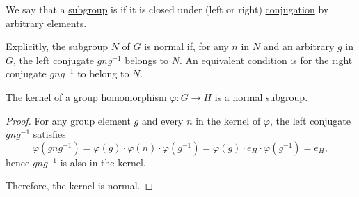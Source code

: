 \begin{definition}\label{def:normal_subgroup}
  We say that a \hyperref[def:group/submodel]{subgroup} is  if it is closed under (left or right) \hyperref[def:group_conjugation]{conjugation} by arbitrary elements.

  Explicitly, the subgroup \( N \) of \( G \) is normal if, for any \( n \) in \( N \) and an arbitrary \( g \) in \( G \), the left conjugate \( gng^{-1} \) belongs to \( N \). An equivalent condition is for the right conjugate \( gng^{-1} \) to belong to \( N \).
\end{definition}

\begin{proposition}\label{thm:kernel_is_normal_subgroup}
  The \hyperref[def:group/kernel]{kernel} of a \hyperref[def:group/homomorphism]{group homomorphism} \( \varphi: G \to H \) is a \hyperref[def:normal_subgroup]{normal subgroup}.
\end{proposition}
\begin{proof}
  For any group element \( g \) and every \( n \) in the kernel of \( \varphi \), the left conjugate \( gng^{-1} \) satisfies
  \begin{equation*}
    \varphi(gng^{-1})
    =
    \varphi(g) \cdot \varphi(n) \cdot \varphi(g^{-1})
    =
    \varphi(g) \cdot e_H \cdot \varphi(g^{-1})
    =
    e_H,
  \end{equation*}
  hence \( gng^{-1} \) is also in the kernel.

  Therefore, the kernel is normal.
\end{proof}


